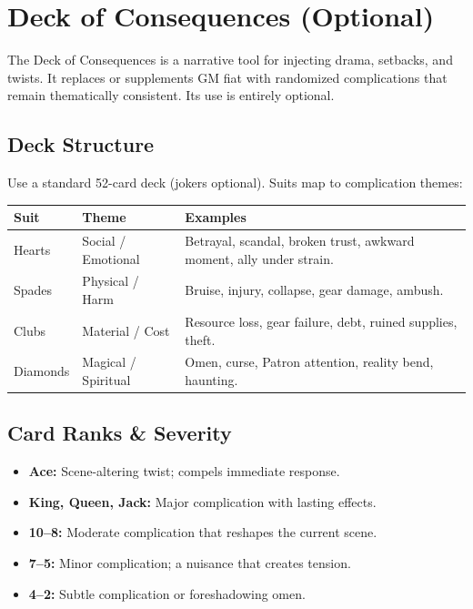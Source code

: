 
\section{Deck of Consequences (Optional)}

The Deck of Consequences is a narrative tool for injecting drama, setbacks, and twists. It replaces or supplements GM fiat with randomized complications that remain thematically consistent. Its use is entirely optional.

\subsection{Deck Structure}

Use a standard 52-card deck (jokers optional). Suits map to complication themes:

\begin{tabular}{@{}llp{8cm}@{}}
\toprule
\textbf{Suit} & \textbf{Theme} & \textbf{Examples} \\
\midrule
Hearts   & Social / Emotional & Betrayal, scandal, broken trust, awkward moment, ally under strain. \\
Spades   & Physical / Harm & Bruise, injury, collapse, gear damage, ambush. \\
Clubs    & Material / Cost & Resource loss, gear failure, debt, ruined supplies, theft. \\
Diamonds & Magical / Spiritual & Omen, curse, Patron attention, reality bend, haunting. \\
\bottomrule
\end{tabular}

\subsection{Card Ranks \& Severity}

\begin{itemize}
  \item \textbf{Ace:} Scene-altering twist; compels immediate response.
  \item \textbf{King, Queen, Jack:} Major complication with lasting effects.
  \item \textbf{10–8:} Moderate complication that reshapes the current scene.
  \item \textbf{7–5:} Minor complication; a nuisance that creates tension.
  \item \textbf{4–2:} Subtle complication or foreshadowing omen.
\end{itemize}


